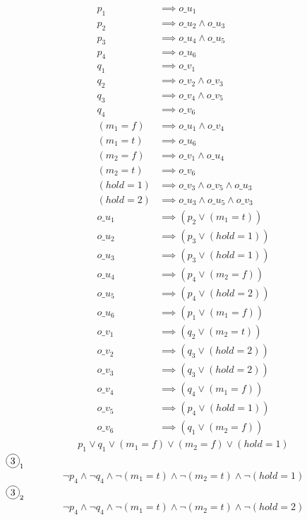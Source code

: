 \documentclass{scrartcl}
\newcommand*\circled[1]{\tikz[baseline=(char.base)]{
            \node[shape=circle,draw,inner sep=2pt] (char) {#1};}}
\begin{document}
\circled{1}
\begin{align*}
  p_1 &\implies o\_u_1 \\
  p_2 &\implies o\_u_2 \land o\_u_3 \\
  p_3 &\implies o\_u_4 \land o\_u_5 \\
  p_4 &\implies o\_u_6 \\
  q_1 &\implies o\_v_1 \\
  q_2 &\implies o\_v_2 \land o\_v_3 \\
  q_3 &\implies o\_v_4 \land o\_v_5 \\
  q_4 &\implies o\_v_6 \\
  (m_1=f) &\implies o\_u_1 \land o\_v_4 \\
  (m_1=t) &\implies o\_u_6 \\
  (m_2=f) &\implies o\_v_1 \land o\_u_4  \\
  (m_2=t) &\implies o\_v_6 \\
  (hold=1) &\implies o\_v_3 \land o\_v_5 \land o\_u_3 \\
  (hold=2) &\implies o\_u_3 \land o\_u_5 \land o\_v_3 \\
  o\_u_1 &\implies (p_2 \lor (m_1=t)) \\
  o\_u_2 &\implies (p_3 \lor (hold=1)) \\
  o\_u_3 &\implies (p_3 \lor (hold=1)) \\
  o\_u_4 &\implies (p_4 \lor (m_2=f)) \\
  o\_u_5 &\implies (p_4 \lor (hold=2)) \\
  o\_u_6 &\implies (p_1 \lor (m_1=f)) \\
  o\_v_1 &\implies (q_2 \lor (m_2=t)) \\
  o\_v_2 &\implies (q_3 \lor (hold=2)) \\
  o\_v_3 &\implies (q_3 \lor (hold=2)) \\
  o\_v_4 &\implies (q_4 \lor (m_1=f)) \\
  o\_v_5 &\implies (p_4 \lor (hold=1)) \\
  o\_v_6 &\implies (q_1 \lor (m_2=f))
\end{align*}
\circled{2}
\begin{align*}
  p_1 \lor q_1 \lor (m_1=f) \lor (m_2=f) \lor (hold=1)
\end{align*}
$\circled{3}_1$
\begin{align*}
  \neg p_4 \land \neg q_4 \land \neg (m_1=t) \land
  \neg (m_2=t) \land \neg (hold=1)
\end{align*}
$\circled{3}_2$
\begin{align*}
  \neg p_4 \land \neg q_4 \land \neg (m_1=t) \land
  \neg (m_2=t) \land \neg (hold=2)
\end{align*}
\end{document}
